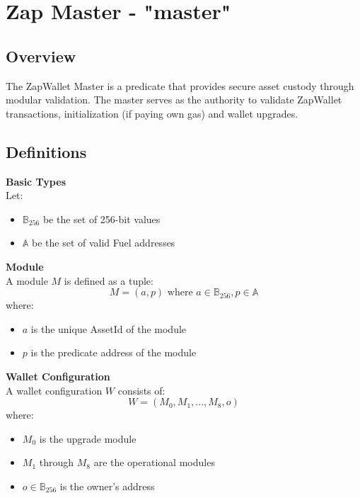 \newpage
\section{Zap Master - {\ttfamily "master"}}
\label{sec:zapmaster_predicate}


\subsection{Overview}
The ZapWallet Master is a predicate that provides secure asset custody through modular validation. The master serves as the authority to validate
ZapWallet transactions, initialization (if paying own gas) and wallet upgrades.

\subsection{Definitions}

\textbf{Basic Types}\\
Let:
\begin{itemize}
    \item $\mathbb{B}_{256}$ be the set of 256-bit values
    \item $\mathbb{A}$ be the set of valid Fuel addresses
\end{itemize}

\textbf{Module}\\
A module $M$ is defined as a tuple:
\[ M = (a, p) \text{ where } a \in \mathbb{B}_{256}, p \in \mathbb{A} \]
where:
\begin{itemize}
    \item $a$ is the unique AssetId of the module
    \item $p$ is the predicate address of the module
\end{itemize}

\textbf{Wallet Configuration}\\
A wallet configuration $W$ consists of:
\[ W = (M_0, M_1, ..., M_8, o) \]
where:
\begin{itemize}
    \item $M_0$ is the upgrade module
    \item $M_1$ through $M_8$ are the operational modules
    \item $o \in \mathbb{B}_{256}$ is the owner's address
\end{itemize}





